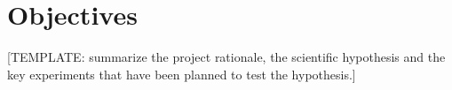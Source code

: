 \chapter{Objectives} %

[TEMPLATE: summarize the project rationale, the scientific hypothesis and the key experiments that have been planned to test the hypothesis.]
